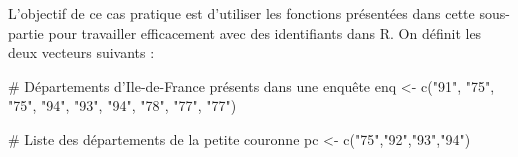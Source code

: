 \documentclass[12pt,twosided, notitlepage]{book}
\newenvironment{Shaded}{}{}
\newcommand{\KeywordTok}[1]{\textcolor[rgb]{0.00,0.00,1.00}{{#1}}}
\newcommand{\StringTok}[1]{\textcolor[rgb]{0.00,0.50,0.50}{{#1}}}
\newcommand{\CommentTok}[1]{\textcolor[rgb]{0.00,0.50,0.00}{{#1}}}
\newcommand{\NormalTok}[1]{{#1}}
\renewenvironment{Shaded}{\begin{snugshade}}{\end{snugshade}}
\begin{document}
L'objectif de ce cas pratique est d'utiliser les fonctions présentées
dans cette sous-partie pour travailler efficacement avec des
identifiants dans R. On définit les deux vecteurs suivants :

\begin{Shaded}
\begin{Highlighting}[]
\CommentTok{# Départements d'Ile-de-France présents dans une enquête}
\NormalTok{enq <-}\StringTok{ }\KeywordTok{c}\NormalTok{(}\StringTok{"91"}\NormalTok{, }\StringTok{"75"}\NormalTok{, }\StringTok{"75"}\NormalTok{, }\StringTok{"94"}\NormalTok{, }\StringTok{"93"}\NormalTok{, }\StringTok{"94"}\NormalTok{, }\StringTok{"78"}\NormalTok{, }\StringTok{"77"}\NormalTok{, }\StringTok{"77"}\NormalTok{)}

\CommentTok{# Liste des départements de la petite couronne}
\NormalTok{pc <-}\StringTok{ }\KeywordTok{c}\NormalTok{(}\StringTok{"75"}\NormalTok{,}\StringTok{"92"}\NormalTok{,}\StringTok{"93"}\NormalTok{,}\StringTok{"94"}\NormalTok{)}
\end{Highlighting}
\end{Shaded}
\end{document}
